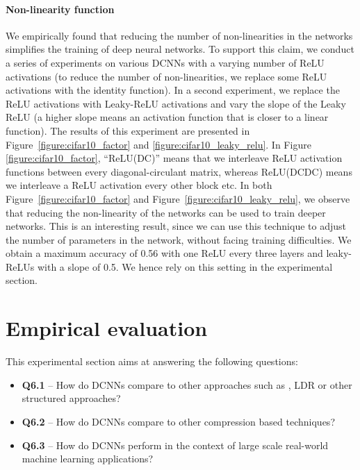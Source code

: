 \paragraph{Non-linearity function}

We empirically found that reducing the number of non-linearities in the networks simplifies the training of deep neural networks.
To support this claim, we conduct a series of experiments on various DCNNs with a varying number of ReLU activations (to reduce the number of non-linearities, we replace some ReLU activations with the identity function).
In a second experiment, we replace the ReLU activations with Leaky-ReLU activations and vary the slope of the Leaky ReLU (a higher slope means an activation function that is closer to a linear function).
The results of this experiment are presented in Figure~\ref{figure:cifar10_factor} and \ref{figure:cifar10_leaky_relu}.
In Figure \ref{figure:cifar10_factor}, ``ReLU(DC)'' means that we interleave ReLU activation functions between every diagonal-circulant matrix, whereas ReLU(DCDC) means we interleave a ReLU activation every other block etc.
In both Figure~\ref{figure:cifar10_factor} and  Figure~\ref{figure:cifar10_leaky_relu}, we observe that reducing the non-linearity of the networks can be used to train deeper networks.
This is an interesting result, since  we can use this technique to adjust the number of parameters in the network, without facing training difficulties. We obtain a maximum accuracy of 0.56 with one ReLU every three layers and leaky-ReLUs with a slope of 0.5.
We hence rely on this setting in the experimental section. 

\section{Empirical evaluation}
\label{section:empirical_evaluation}

This experimental section aims at answering the following questions:
\begin{itemize}
    \item[] \textbf{Q6.1} -- How do DCNNs compare to other approaches such as \ACDC, LDR or other structured approaches?
    \item[] \textbf{Q6.2} -- How do DCNNs compare to other compression based techniques?
    \item[] \textbf{Q6.3} -- How do DCNNs perform in the context of large scale real-world machine learning applications?  
\end{itemize}


